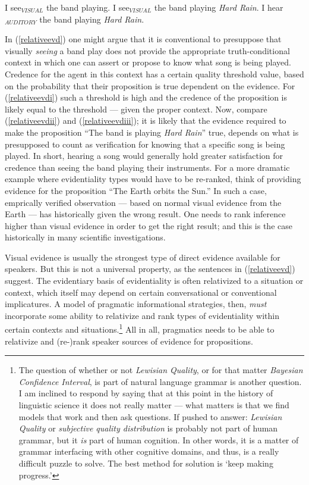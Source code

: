\documentclass[11pt]{article}
\begin{document}
\begin{exe}
\ex \label{relativeevd}
\begin{xlist}
\ex I see$_{VISUAL}$ the band playing.\label{relativeevdi}
\ex I see$_{VISUAL}$ the band playing {\sl Hard Rain}.\label{relativeevdii}
\ex I hear$_{AUDITORY}$ the band playing {\sl Hard Rain}.\label{relativeevdiii}
\end{xlist} 
\end{exe}

In (\ref{relativeevd}) one might argue that it is conventional to presuppose that visually {\sl seeing} a band play does not provide the appropriate truth-conditional context in which one can assert or propose to know what song is being played. Credence for the agent in this context has a certain quality threshold value, based on the probability that their proposition is true dependent on the evidence. For (\ref{relativeevdi}) such a threshold is high and the credence of the proposition is likely equal to the threshold --- given the proper context. Now, compare (\ref{relativeevdii}) and (\ref{relativeevdiii}); it is likely that the evidence required to make the proposition ``The band is playing {\sl Hard Rain}'' true, depends on what is presupposed to count as verification for knowing that a specific song is being played. In short, hearing a song would generally hold greater satisfaction for credence than seeing the band playing their instruments. For a more dramatic example where evidentiality types would have to be re-ranked, think of providing evidence for the proposition ``The Earth orbits the Sun.'' In such a case, emprically verified observation --- based on normal visual evidence from the Earth --- has historically given the wrong result. One needs to rank inference higher than visual evidence in order to get the right result; and this is the case historically in many scientific investigations. 

Visual evidence is usually the strongest type of direct evidence available for speakers. But this is not a universal property, as the sentences in (\ref{relativeevd}) suggest. The evidentiary basis of evidentiality is often relativized to a situation or context, which itself may depend on certain conversational or conventional implicatures. A model of pragmatic informational strategies, then, {\sl must} incorporate some ability to relativize and rank types of evidentiality within certain contexts and situations.\footnote{The question of whether or not {\sl Lewisian Quality}, or for that matter {\sl Bayesian Confidence Interval}, is part of natural language grammar is another question. I am inclined to respond by saying that at this point in the history of linguistic science it does not really matter --- what matters is that we find models that work and then ask questions. If pushed to answer: {\sl Lewisian Quality} or {\sl subjective quality distribution} is probably not part of human grammar, but it {\sl is} part of human cognition. In other words, it is a matter of grammar interfacing with other cognitive domains, and thus, is a really difficult puzzle to solve. The best method for solution is `keep making progress.'} All in all, pragmatics needs to be able to relativize and (re-)rank speaker sources of evidence for propositions. 
\end{document}
